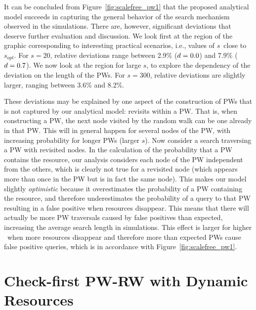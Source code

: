 \documentclass[]{elsarticle}
\newcommand{\s}		{\ensuremath{s}}		\newcommand{\sopt}	{\ensuremath{s_{opt}}}		\newcommand{\p}		{\ensuremath{p}}		\newcommand{\W}		{\ensuremath{W}}		\newcommand{\w}		{\ensuremath{w}}		\newcommand{\lsave}	{\ensuremath{\overline{l}_s}}	\newcommand{\lave}	{\ensuremath{\overline{l}}}	\newcommand{\lopt}	{\ensuremath{\overline{l}_{opt}}}
\begin{document}
It can be concluded from Figure~\ref{fig:scalefree_pw1} that the proposed analytical model succeeds in capturing the general behavior of the search mechanism observed in the simulations. There are, however, significant deviations that deserve further evaluation and discussion. We look first at the region of the graphic corresponding to interesting practical scenarios, i.e., values of \s\ close to \sopt. For $\s=20$, relative deviations range between 2.9\% ($d=0.0$) and 7.9\% ($d=0.7$).
We now look at the region for large \s, to explore the dependency of the deviation on the length of the PWs. For $\s=300$, relative deviations are slightly larger, ranging between 3.6\% and 8.2\%.

These deviations may be explained by one aspect of the construction of PWs that is not captured by our analytical model: revisits within a PW. That is, when constructing a PW, the next node visited by the random walk can be one already in that PW. This will in general happen for several nodes of the PW, with increasing probability for longer PWs (larger \s).
Now consider a search traversing a PW with revisited nodes. In the calculation of the probability that a PW contains the resource, our analysis considers each node of the PW independent from the others, which is clearly not true for a revisited node (which appears more than once in the PW but is in fact the same node). This makes our model slightly \emph{optimistic} because it overestimates the probability of a PW containing the resource, and therefore underestimates the probability of a query to that PW resulting in a false positive when resources disappear. This means that there will actually be more PW traversals caused by false positives than expected, increasing the average search length in simulations. This effect is larger for higher \pd\, when more resources disappear and therefore more than expected PWs cause false positive queries, which is in accordance with Figure~\ref{fig:scalefree_pw1}.


\section{Check-first PW-RW with Dynamic Resources}
\label{sec:check_first}
\end{document}
